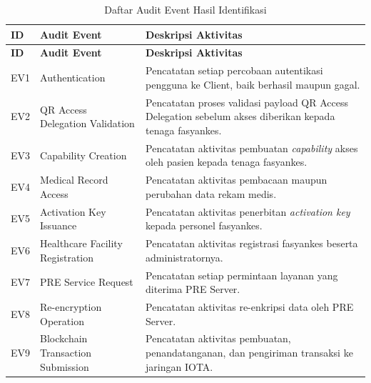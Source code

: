 \begin{xltabular}
    {\textwidth}
    {|>{\centering\arraybackslash}p{1cm}
     |>{\raggedright\arraybackslash}p{4cm}
     |X|}

\caption{Daftar Audit Event Hasil Identifikasi}
\label{tab:audit-event-list}\\

\hline
\textbf{ID} &
\textbf{Audit Event} &
\textbf{Deskripsi Aktivitas} \\
\hline
\endfirsthead

\hline
\textbf{ID} &
\textbf{Audit Event} &
\textbf{Deskripsi Aktivitas} \\
\hline
\endhead

\hline
\endfoot

\hline
\endlastfoot

EV1 & Authentication & Pencatatan setiap percobaan autentikasi pengguna ke Client, baik berhasil maupun gagal. \\
\hline

EV2 & QR Access Delegation Validation & Pencatatan proses validasi payload QR Access Delegation sebelum akses diberikan kepada tenaga fasyankes. \\
\hline

EV3 & Capability Creation & Pencatatan aktivitas pembuatan \textit{capability} akses oleh pasien kepada tenaga fasyankes. \\
\hline

EV4 & Medical Record Access & Pencatatan aktivitas pembacaan maupun perubahan data rekam medis. \\
\hline

EV5 & Activation Key Issuance & Pencatatan aktivitas penerbitan \textit{activation key} kepada personel fasyankes. \\
\hline

EV6 & Healthcare Facility Registration & Pencatatan aktivitas registrasi fasyankes beserta administratornya. \\
\hline

EV7 & PRE Service Request & Pencatatan setiap permintaan layanan yang diterima PRE Server. \\
\hline

EV8 & Re-encryption Operation & Pencatatan aktivitas re-enkripsi data oleh PRE Server. \\
\hline

EV9 & Blockchain Transaction Submission & Pencatatan aktivitas pembuatan, penandatanganan, dan pengiriman transaksi ke jaringan IOTA. \\
\hline


\end{xltabular}
